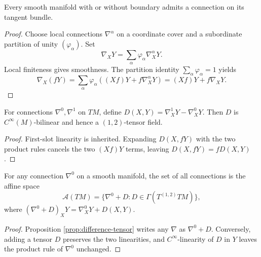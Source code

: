 \begin{proposition}
\label{prop:tangent-bundle-admits-connection}

Every smooth manifold with or without boundary admits a connection on its tangent bundle.
\end{proposition}
\begin{proof}
\sketch Choose local connections $\nabla^\alpha$ on a coordinate cover and a subordinate partition of unity $(\varphi_\alpha)$. Set
\begin{equation}
\nabla_XY=\sum_\alpha\varphi_\alpha\nabla_X^\alpha Y.\tag{4.11}
\end{equation}
Local finiteness gives smoothness. The partition identity $\sum_\alpha\varphi_\alpha=1$ yields
\[
\nabla_X(fY)=\sum_\alpha\varphi_\alpha((Xf)Y+f\nabla_X^\alpha Y)=(Xf)Y+f\nabla_XY.
\]
\end{proof}

\begin{proposition}
\label{prop:difference-tensor}





For connections $\nabla^0,\nabla^1$ on $TM$, define $D(X,Y)=\nabla_X^1Y-\nabla_X^0Y$. Then $D$ is $C^\infty(M)$-bilinear and hence a $(1,2)$-tensor field.
\end{proposition}
\begin{proof}

\sketch First-slot linearity is inherited. Expanding $D(X,fY)$ with the two product rules cancels the two $(Xf)Y$ terms, leaving $D(X,fY)=fD(X,Y)$.
\end{proof}

\begin{theorem}
\label{thm:connections-affine-space}





For any connection $\nabla^0$ on a smooth manifold, the set of all connections is the affine space
\[
\mathcal A(TM)=\{\nabla^0+D:D\in\Gamma(T^{(1,2)}TM)\},
\]
where $(\nabla^0+D)_XY=\nabla^0_XY+D(X,Y)$.
\end{theorem}
\begin{proof}

\sketch Proposition \ref{prop:difference-tensor} writes any $\nabla$ as $\nabla^0+D$. Conversely, adding a tensor $D$ preserves the two linearities, and $C^\infty$-linearity of $D$ in $Y$ leaves the product rule of $\nabla^0$ unchanged.
\end{proof}
